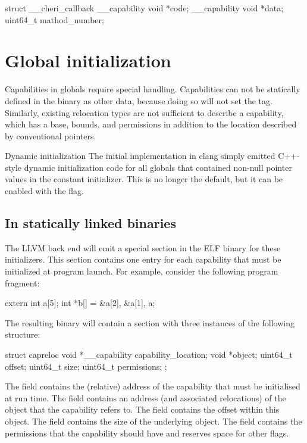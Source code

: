 \begin{csnippet}
struct __cheri_callback
{
	__capability void *code;
	__capability void *data;
	uint64_t           mathod_number;
}
\end{csnippet}

\section{Global initialization}
Capabilities in globals require special handling.
Capabilities can not be statically defined in the binary as other data, because doing so will not set the tag.
Similarly, existing relocation types are not sufficient to describe a capability, which has a base, bounds, and permissions in addition to the location described by conventional pointers.

\begin{notebox}{Dynamic initialization}
The initial implementation in clang simply emitted C++-style dynamic initialization code for all globals that contained non-null pointer values in the constant initializer.
This is no longer the default, but it can be enabled with the  flag.
\end{notebox}
\subsection{In statically linked binaries}

The LLVM back end will emit a special section in the ELF binary for these initializers.
This section contains one entry for each capability that must be initialized at program launch.
For example, consider the following program fragment:
\begin{csnippet}
extern int a[5];
int *b[] = {&a[2], &a[1], a};
\end{csnippet}

The resulting binary will contain a  section with three instances of the following structure:

\begin{csnippet}
struct capreloc
{
	void *__capability capability_location;
	void              *object;
	uint64_t           offset;
	uint64_t           size;
	uint64_t           permissions;
};
\end{csnippet}

The  field contains the (relative) address of the capability that must be initialised at run time.
The  field contains an address (and associated relocations) of the object that the capability refers to.
The  field contains the offset within this object.
The  field contains the size of the underlying object.
The  field contains the permissions that the capability should have and reserves space for other flags.

